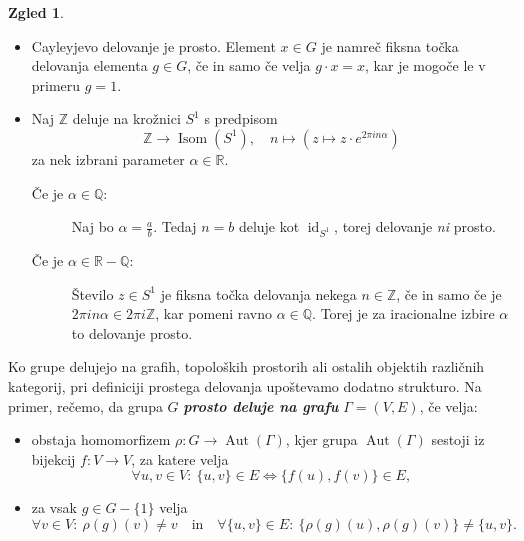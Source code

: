 \documentclass[11pt]{book}
\def\ZZ{\mathbb{Z}}
\def\QQ{\mathbb{Q}}
\def\RR{\mathbb{R}}
\DeclareMathOperator\Aut{Aut}
\DeclareMathOperator\Isom{Isom}
\DeclareMathOperator\id{id}
\def\definicija{\color{rdeca}\bf\em}
\theoremstyle{definition}
\theoremstyle{zgled}
\newtheorem*{zgled}{Zgled}
\theoremstyle{odprtproblem}
\theoremstyle{domacanaloga}
\theoremstyle{izrek}
\begin{document}
\begin{zgled}
\begin{itemize}
    \item Cayleyjevo delovanje je prosto. Element $x \in G$ je namreč fiksna točka delovanja elementa $g \in G$, če in samo če velja $g \cdot x = x$, kar je mogoče le v primeru $g = 1$.

    \item Naj $\ZZ$ deluje na krožnici $S^1$ s predpisom
    \[
    \ZZ \to \Isom(S^1), \quad n \mapsto (z \mapsto z \cdot e^{2 \pi i n \alpha})
    \]
    za nek izbrani parameter $\alpha \in \RR$.
    \begin{description}
        \item[Če je $\alpha \in \QQ$:] Naj bo $\alpha = \frac{a}{b}$. Tedaj $n = b$ deluje kot $\id_{S^1}$, torej delovanje {\em ni} prosto.

        \item[Če je $\alpha \in \RR - \QQ$:] Število $z \in S^1$ je fiksna točka delovanja nekega $n \in \ZZ$, če in samo če je $2 \pi i n \alpha \in 2 \pi i \ZZ$, kar pomeni ravno $\alpha \in \QQ$. Torej je za iracionalne izbire $\alpha$ to delovanje prosto.
    \end{description}
\end{itemize}
\end{zgled}

Ko grupe delujejo na grafih, topoloških prostorih ali ostalih objektih različnih kategorij, pri definiciji prostega delovanja upoštevamo dodatno strukturo. Na primer, rečemo, da grupa $G$ {\definicija prosto deluje na grafu} $\Gamma = (V,E)$, če velja:
\begin{itemize}
    \item obstaja homomorfizem $\rho \colon G \to \Aut(\Gamma)$, kjer grupa $\Aut(\Gamma)$ sestoji iz bijekcij $f \colon V \to V$, za katere velja
    \[
    \forall u,v \in V \colon \ \{ u,v \} \in E \Leftrightarrow \{ f(u), f(v) \} \in E,
    \]

    \item za vsak $g \in G - \{ 1 \}$ velja
    \[
    \forall v \in V \colon \ \rho(g)(v) \neq v \quad \text{in} \quad
    \forall \{u,v\}\in E \colon \ \{ \rho(g)(u), \rho(g)(v) \} \neq \{ u,v \}.
    \]
\end{itemize}
\end{document}

